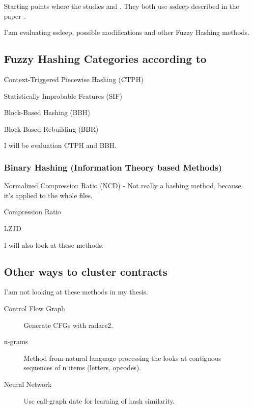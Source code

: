 \documentclass[../main.tex]{subfiles}
\begin{document}
Starting points where the studies  and .
They both use ssdeep\cite{ssdeep} described in the paper .

I'am evaluating ssdeep, possible modifications and other Fuzzy Hashing methods.

\subsection{Fuzzy Hashing Categories according to }
\begin{ul}
  \item Context-Triggered Piecewise Hashing (CTPH)
  \item Statistically Improbable Features (SIF)
  \item Block-Based Hashing (BBH)
  \item Block-Based Rebuilding (BBR)
\end{ul}
I will be evaluation CTPH and BBH.

\subsubsection{Binary Hashing (Information Theory based Methods)}
\begin{ul}
  \item Normalized Compression Ratio (NCD) - Not really a hashing method, because it's applied to the whole files.
  \item Compression Ratio
  \item LZJD
\end{ul}
I will also look at these methods.

\subsection{Other ways to cluster contracts}
I'am not looking at these methods in my thesis.
\begin{description}
  \item[Control Flow Graph] Generate CFGs with radare2.
  \item[n-grams] Method from natural language processing the looks at contiguous sequences of n items (letters, opcodes).
  \item[Neural Network] Use call-graph date for learning of hash similarity.
\end{description}
\end{document}
